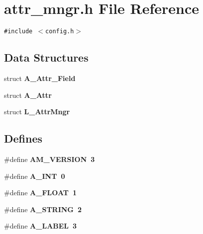 \section{attr\_\-mngr.h File Reference}
\label{attr__mngr_8h}
{\tt \#include $<$config.h$>$}\par
\subsection*{Data Structures}
\begin{CompactItemize}
\item 
struct \bf{A\_\-Attr\_\-Field}
\item 
struct \bf{A\_\-Attr}
\item 
struct \bf{L\_\-Attr\-Mngr}
\end{CompactItemize}
\subsection*{Defines}
\begin{CompactItemize}
\item 
\#define \bf{AM\_\-VERSION}~3
\item 
\#define \bf{A\_\-INT}~0
\item 
\#define \bf{A\_\-FLOAT}~1
\item 
\#define \bf{A\_\-STRING}~2
\item 
\#define \bf{A\_\-LABEL}~3
\end{CompactItemize}
